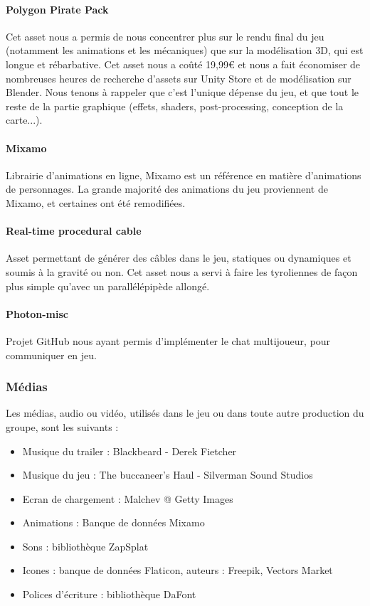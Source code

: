         \paragraph{Polygon Pirate Pack} Cet asset nous a permis de nous concentrer plus sur le rendu final du jeu (notamment 
        les animations et les mécaniques) que sur la modélisation 3D, qui est longue et rébarbative. Cet asset nous a coûté 19,99€ 
        et nous a fait économiser de nombreuses heures de recherche d'assets sur Unity Store et de modélisation sur Blender. 
        Nous tenons à rappeler que c'est l'unique dépense du jeu, et que tout le reste de la partie graphique (effets, shaders,  
        post-processing, conception de la carte...).

        \paragraph{Mixamo} Librairie d'animations en ligne, Mixamo est un référence en matière d'animations de personnages. La grande 
        majorité des animations du jeu proviennent de Mixamo, et certaines ont été remodifiées.

        \paragraph{Real-time procedural cable} Asset permettant de générer des câbles dans le jeu, statiques ou dynamiques et soumis 
        à la gravité ou non. Cet asset nous a servi à faire les tyroliennes de façon plus simple qu'avec un parallélépipède allongé. 

        \paragraph{Photon-misc} Projet GitHub nous ayant permis d'implémenter le chat multijoueur, pour communiquer en jeu.

    \vspace{0.5cm}    
    \subsubsection{Médias}
    \vspace{0.5cm}

        Les médias, audio ou vidéo, utilisés dans le jeu ou dans toute autre production du groupe, sont les suivants :

        \begin{itemize}
            \item Musique du trailer : Blackbeard - Derek Fietcher
            \item Musique du jeu : The buccaneer's Haul - Silverman Sound Studios
            \item Ecran de chargement : Malchev @ Getty Images
            \item Animations : Banque de données Mixamo
            \item Sons : bibliothèque ZapSplat
            \item Icones : banque de données Flaticon, auteurs : Freepik, Vectors Market
            \item Polices d'écriture : bibliothèque DaFont
        \end{itemize}